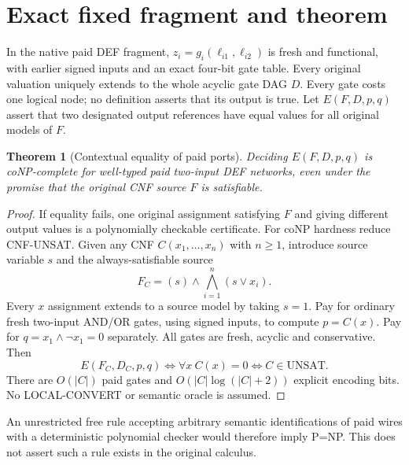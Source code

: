 \documentclass[11pt]{article}
\newtheorem{theorem}{Theorem}
\begin{document}
\section*{Exact fixed fragment and theorem}
In the native paid DEF fragment, $z_i=g_i(\ell_{i1},\ell_{i2})$ is fresh and functional, with earlier signed inputs and an exact four-bit gate table. Every original valuation uniquely extends to the whole acyclic gate DAG $D$. Every gate costs one logical node; no definition asserts that its output is true. Let $E(F,D,p,q)$ assert that two designated output references have equal values for all original models of $F$.

\begin{theorem}[Contextual equality of paid ports]
Deciding $E(F,D,p,q)$ is coNP-complete for well-typed paid two-input DEF networks, even under the promise that the original CNF source $F$ is satisfiable.
\end{theorem}
\begin{proof}
If equality fails, one original assignment satisfying $F$ and giving different output values is a polynomially checkable certificate. For coNP hardness reduce CNF-UNSAT. Given any CNF $C(x_1,\ldots,x_n)$ with $n\ge1$, introduce source variable $s$ and the always-satisfiable source
\[
 F_C=(s)\land\bigwedge_{i=1}^n(s\lor x_i).
\]
Every $x$ assignment extends to a source model by taking $s=1$. Pay for ordinary fresh two-input AND/OR gates, using signed inputs, to compute $p=C(x)$. Pay for $q=x_1\land\neg x_1=0$ separately. All gates are fresh, acyclic and conservative. Then
\[
 E(F_C,D_C,p,q)\iff \forall x\ C(x)=0\iff C\in\mathrm{UNSAT}.
\]
There are $O(|C|)$ paid gates and $O(|C|\log(|C|+2))$ explicit encoding bits. No LOCAL-CONVERT or semantic oracle is assumed.
\end{proof}
An unrestricted free rule accepting arbitrary semantic identifications of paid wires with a deterministic polynomial checker would therefore imply P=NP. This does not assert such a rule exists in the original calculus.
\end{document}
